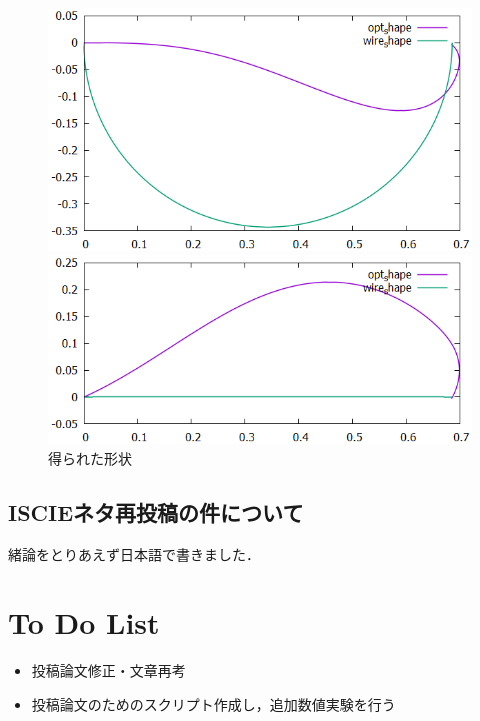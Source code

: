 \documentclass[11pt]{jsarticle}
\begin{document}
			\begin{figure}
				\begin{minipage}{0.5\hsize}
					\centering
					\includegraphics[width = \columnwidth]{./figure/0129/AlignWire_xyview.png}
				\end{minipage}
				\begin{minipage}{0.5\hsize}
					\centering
					\includegraphics[width = \columnwidth]{./figure/0129/AlignWire_xzview.png}
				\end{minipage}
			\caption{得られた形状}
			\end{figure}
		
		\subsection{ISCIEネタ再投稿の件について}
			緒論をとりあえず日本語で書きました．
	\section{To Do List}
		\begin{itemize}
			\item 投稿論文修正・文章再考
			\item 投稿論文のためのスクリプト作成し，追加数値実験を行う
		\end{itemize}
				
	\newpage
\vspace{10cm}
	

\vspace{14cm}
	\articleSPRfour
	\articleSPRfive
\end{document}
